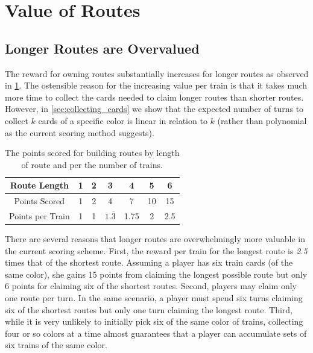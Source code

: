 \newpage
\section{Value of Routes}
\subsection{Longer Routes are Overvalued}
\label{sec:overvalued}
The reward for owning routes substantially 
increases for longer routes as observed in 
\cref{table:current_value}.
The ostensible reason for the 
increasing value per train is that
it takes much more time to collect
the cards needed to claim longer
routes than shorter routes.
However, in \cref{sec:collecting_cards} we show that the expected 
number of turns to collect $k$ cards of a specific
color is linear in relation to $k$
(rather than polynomial as the current scoring method suggests).

\begin{table}[H]
    \renewcommand{\arraystretch}{1.5}
    \centering
    \begin{tabular}{| c | c | c | c | c | c | c |}
    \hline
     Route Length & 1 & 2 & 3 & 4 & 5 & 6\\
     \hline
     Points Scored & 1 & 2 & 4 & 7 & 10 & 15\\
     \hline
     Points per Train & 1 & 1 & $1.\overline{3}$ & 1.75 & 2 & 2.5\\
     \hline
    \end{tabular}
    \vspace{.5cm}
    \caption{The points scored for building routes by length of route
    and per the number of trains.}
    \vspace{-.75cm}
    \label{table:current_value}
\end{table}

There are several reasons that longer routes are
overwhelmingly more valuable in the current scoring scheme.
First, the reward per train for the longest route is \textit{2.5}
times that of the shortest route.
Assuming a player has six train cards (of the same color),
she gains 15 points from claiming the longest possible route but only
6 points for claiming six of the shortest routes.
Second, players may claim only one route per turn.
In the same scenario, a player must spend six turns
claiming six of the shortest routes but only one turn
claiming the longest route.
Third, while it is very unlikely to initially pick six of the same
color of trains, collecting four or so colors at a time almost
guarantees that a player can accumulate sets of six trains
of the same color.

